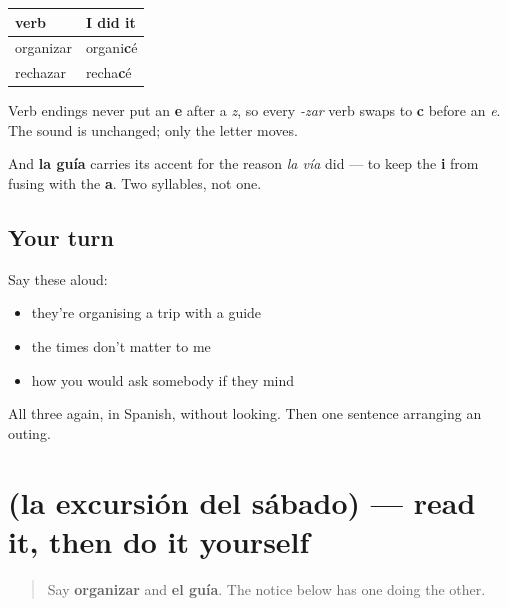 \begin{grammarlens}[title={Grammar Lens: two spellings the ending forces}]
\noindent
\begin{tabularx}{\linewidth}{@{}>{\raggedright\arraybackslash}X>{\raggedright\arraybackslash}X@{}}
\toprule
\textbf{verb} & \textbf{I did it} \\
\midrule
organizar & organi\textbf{c}é \\
rechazar & recha\textbf{c}é \\
\bottomrule
\end{tabularx}

Verb endings never put an \textbf{e} after a \emph{z}, so every \emph{-zar} verb swaps to \textbf{c} before an \emph{e}. The sound is unchanged; only the letter moves.

And \textbf{la guía} carries its accent for the reason \emph{la vía} did — to keep the \textbf{i} from fusing with the \textbf{a}. Two syllables, not one.
\end{grammarlens}

\subsection*{Your turn}
Say these aloud:

\begin{itemize}
\raggedright
  \item they're organising a trip with a guide
  \item the times don't matter to me
  \item how you would ask somebody if they mind
\end{itemize}

\begin{tcolorbox}[breakable,colback=teal!4,colframe=teal!35!black,title={Before you move on}]
All three again, in Spanish, without looking. Then one sentence arranging an outing.
\end{tcolorbox}
\section[Practice]{(la excursión del sábado) — read it, then do it yourself}

\label{lesson:ES-C463-sintesis-guia}



\begin{quote}
Say \textbf{organizar} and \textbf{el guía}. The notice below has one doing the other.
\end{quote}

